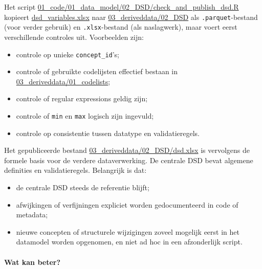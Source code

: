 \documentclass{VSAnote}
\begin{document}
Het script \url{01_code/01_data_model/02_DSD/check_and_publish_dsd.R} kopieert \url{dsd_variables.xlsx} naar \url{03_deriveddata/02_DSD} als \texttt{.parquet}-bestand (voor verder gebruik) en \texttt{.xlsx}-bestand (als naslagwerk), maar voert eerst verschillende controles uit. Voorbeelden zijn:
\begin{itemize}[nosep]
\item controle op unieke \texttt{concept\_id}'s;
\item controle of gebruikte codelijsten effectief bestaan in \url{03_deriveddata/01_codelists};
\item controle of regular expressions geldig zijn;
\item controle of \texttt{min} en \texttt{max} logisch zijn ingevuld;
\item controle op consistentie tussen datatype en validatieregels.
\end{itemize}

Het gepubliceerde bestand \url{03_deriveddata/02_DSD/dsd.xlsx} is vervolgens de formele basis voor de verdere dataverwerking. De centrale DSD bevat algemene definities en validatieregels. Belangrijk is dat:
\begin{itemize}[nosep]
\item de centrale DSD steeds de referentie blijft;
\item afwijkingen of verfijningen expliciet worden gedocumenteerd in code of metadata;
\item nieuwe concepten of structurele wijzigingen zoveel mogelijk eerst in het datamodel worden opgenomen, en niet ad hoc in een afzonderlijk script.
\end{itemize}



\paragraph{Wat kan beter?}
\end{document}
